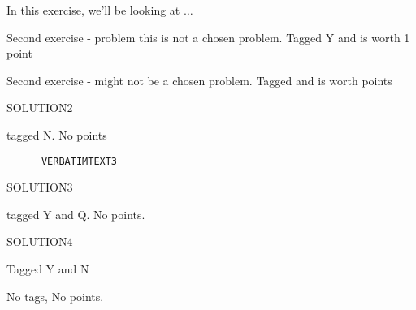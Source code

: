\begin{intro}
	In this exercise, we'll be looking at \( \dots \)
\end{intro}
\begin{problem}
  Second exercise - problem this is not a chosen problem. Tagged Y and is worth 1 point
\end{problem}
\begin{problem}
  Second exercise - might not be a chosen problem. \makeatletter Tagged \exb@currentTags and is worth \exb@currentPoints points\makeatother
\end{problem}
\begin{solution}
	SOLUTION2
\end{solution}
\begin{problem}
  \lipsum[1] tagged N. No points
\begin{verbatim}
      VERBATIMTEXT3
  \end{verbatim}
\end{problem}
\begin{solution}
	SOLUTION3
\end{solution}
\begin{problem}
tagged Y and Q. No points. \lipsum[2-3]
\end{problem}
\begin{solution}
	SOLUTION4
\end{solution}
\begin{problem}
\lipsum[4] Tagged Y and N
\end{problem}
\begin{problem}
\lipsum[4] No tags, No points.
\end{problem}
